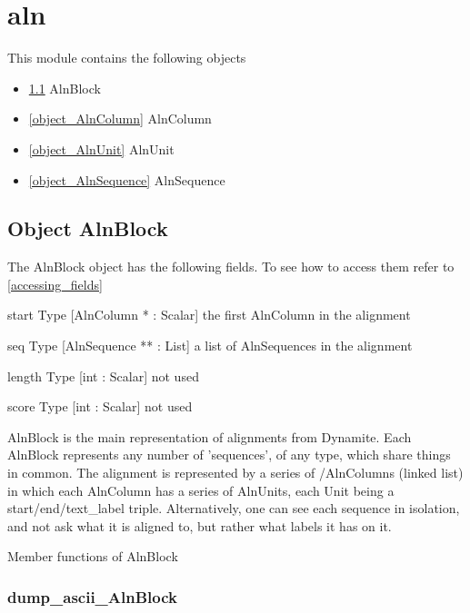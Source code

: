 \section{aln}
\label{module_aln}
This module contains the following objects

\begin{itemize}
\item \ref{object_AlnBlock} AlnBlock

\item \ref{object_AlnColumn} AlnColumn

\item \ref{object_AlnUnit} AlnUnit

\item \ref{object_AlnSequence} AlnSequence

\end{itemize}
\subsection{Object AlnBlock}

\label{object_AlnBlock}

The AlnBlock object has the following fields. To see how to access them refer to \ref{accessing_fields}
\begin{description}
\item{start} Type [AlnColumn * : Scalar]  the first AlnColumn in the alignment

\item{seq} Type [AlnSequence ** : List]  a list of AlnSequences in the alignment

\item{length} Type [int : Scalar]  not used 

\item{score} Type [int : Scalar]  not used

\end{description}
AlnBlock is the main representation of alignments from Dynamite. Each
AlnBlock represents any number of 'sequences', of any type, which share
things in common. The alignment is represented by a series of /AlnColumns 
(linked list) in which each AlnColumn has a series of AlnUnits, each 
Unit being a start/end/text_label triple. Alternatively, one can see
each sequence in isolation, and not ask what it is aligned to, but rather
what labels it has on it. 




Member functions of AlnBlock

\subsubsection{dump_ascii_AlnBlock}

